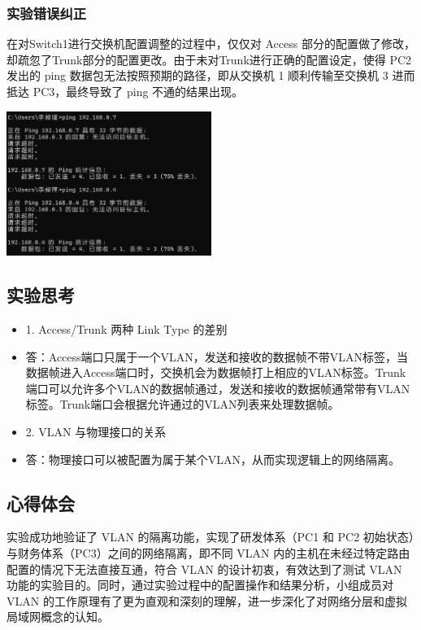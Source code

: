 \documentclass{article}
\begin{document}
\subsubsection{实验错误纠正}
在对Switch1进行交换机配置调整的过程中，仅仅对 Access 部分的配置做了修改，却疏忽了Trunk部分的配置更改。由于未对Trunk进行正确的配置设定，使得 PC2 发出的 ping 数据包无法按照预期的路径，即从交换机 1 顺利传输至交换机 3 进而抵达 PC3，最终导致了 ping 不通的结果出现。

\vspace{10pt}
\centerline{\includegraphics[width=0.5\textwidth]{2_5_images/8.png}}
\vspace{10pt}

\subsection{实验思考}
\begin{itemize}
    \item 1. Access/Trunk 两种 Link Type 的差别
    \item 答：Access端口只属于一个VLAN，发送和接收的数据帧不带VLAN标签，当数据帧进入Access端口时，交换机会为数据帧打上相应的VLAN标签。Trunk端口可以允许多个VLAN的数据帧通过，发送和接收的数据帧通常带有VLAN标签。Trunk端口会根据允许通过的VLAN列表来处理数据帧。
    
    \item 2. VLAN 与物理接口的关系
    \item 答：物理接口可以被配置为属于某个VLAN，从而实现逻辑上的网络隔离。
\end{itemize}

\subsection{心得体会}
实验成功地验证了 VLAN 的隔离功能，实现了研发体系（PC1 和 PC2 初始状态）与财务体系（PC3）之间的网络隔离，即不同 VLAN 内的主机在未经过特定路由配置的情况下无法直接互通，符合 VLAN 的设计初衷，有效达到了测试 VLAN 功能的实验目的。同时，通过实验过程中的配置操作和结果分析，小组成员对 VLAN 的工作原理有了更为直观和深刻的理解，进一步深化了对网络分层和虚拟局域网概念的认知。
\end{document}
